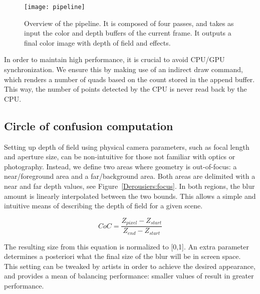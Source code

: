 	\begin{figure}[htb]\centering
	\texttt{[image: pipeline]}
	\caption{Overview of the pipeline. It is composed of four passes, and takes as input the color and depth buffers of the current frame. It outputs a final color image with depth of field and \bokeh effects.}
	\label{Derousiers:pipeline}
	\end{figure}

In order to maintain high performance, it is crucial to avoid CPU/GPU synchronization. We ensure this by making use of an indirect draw command, which renders a number of quads based on the count stored in the append buffer. This way, the number of \bokeh points detected by the CPU is never read back by the CPU.

\subsection{Circle of confusion computation}
Setting up depth of field using physical camera parameters, such as focal length and aperture size, can be non-intuitive for those not familiar with optics or photography. Instead, we define two areas where geometry is out-of-focus: a near/foreground area and a far/background area. Both areas are delimited with a near and far depth values, see Figure~\ref{Derousiers:focus}. In both regions, the blur amount is linearly interpolated between the two bounds. This allows a simple and intuitive means of describing the depth of field for a given scene.

$$
	CoC = \frac{Z_{pixel} - Z_{start} }{ Z_{end} - Z_{start} }
$$

The resulting \coc size from this equation is normalized to [0,1]. An extra parameter  determines a posteriori what the final size of the blur will be in screen space. This setting can be tweaked by artists in order to achieve the desired appearance, and provides a mean of balancing performance: smaller values of  result in greater performance.


